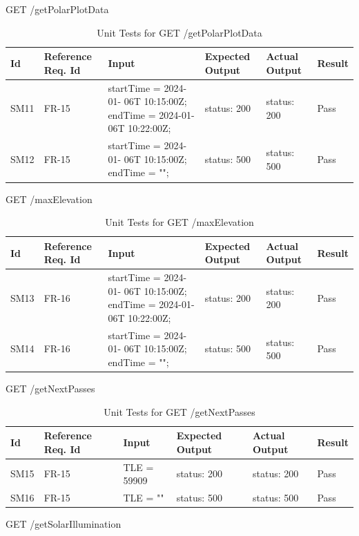 \documentclass[12pt, titlepage]{article}
\begin{document}
GET /getPolarPlotData

\begin{center}
\begin{longtable}{|p{1cm} | p{2cm} |p{2cm}| p{2cm} |p{2cm}| p{2cm}|}
\caption{Unit Tests for \newline GET /getPolarPlotData}
\hline
\textbf{Id} & \textbf{Reference Req. Id} & \textbf{Input} & \textbf{Expected Output} & \textbf{Actual Output} & \textbf{Result} \\
\hline
SM11 & FR-15 & { startTime = 2024-01- 06T 10:15:00Z;
    endTime = 2024-01- 06T 10:22:00Z;} & { status: 200 } & { status: 200 } & Pass
\\
\hline
SM12 & FR-15 & { startTime = 2024-01- 06T 10:15:00Z;
    endTime = "";} & { status: 500 } & { status: 500 } & Pass
\\
\hline

\end{longtable}

\end{center}
GET /maxElevation

\begin{center}
\begin{longtable}{|p{1cm} | p{2cm} |p{2cm}| p{2cm} |p{2cm}| p{2cm}|}
\caption{Unit Tests for \newline GET /maxElevation}
\hline
\textbf{Id} & \textbf{Reference Req. Id} & \textbf{Input} & \textbf{Expected Output} & \textbf{Actual Output} & \textbf{Result} \\
\hline
SM13 & FR-16 & { startTime = 2024-01- 06T 10:15:00Z;
    endTime = 2024-01- 06T 10:22:00Z;} & { status: 200 } & { status: 200 } & Pass
\\
\hline
SM14 & FR-16 & { startTime = 2024-01- 06T 10:15:00Z;
    endTime = "";} & { status: 500 } & { status: 500 } & Pass
\\
\hline

\end{longtable}

\end{center}
GET /getNextPasses

\begin{center}
\begin{longtable}{|p{1cm} | p{2cm} |p{2cm}| p{2cm} |p{2cm}| p{2cm}|}
\caption{Unit Tests for \newline GET /getNextPasses}
\hline
\textbf{Id} & \textbf{Reference Req. Id} & \textbf{Input} & \textbf{Expected Output} & \textbf{Actual Output} & \textbf{Result} \\
\hline
SM15 & FR-15 & { TLE = 59909 } & { status: 200 } & { status: 200 } & Pass
\\
\hline
SM16 & FR-15 & { TLE = ""} & { status: 500 } & { status: 500 } & Pass
\\
\hline

\end{longtable}

\end{center}
GET /getSolarIllumination
\end{document}
